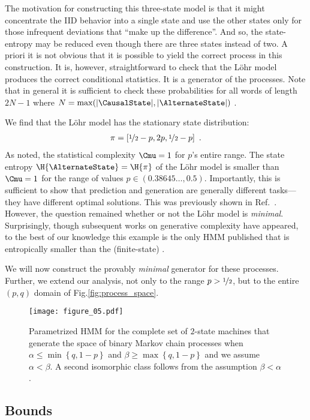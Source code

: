 \documentclass[final,nofootinbib,aps,pre,twocolumn,showpacs,groupaddress,preprintnumbers,floatfix]{revtex4-1}
\newcommand{\Lohr}{L{\"o}hr\xspace}
\begin{document}
The motivation for constructing this three-state model is that it might
concentrate the IID behavior into a single state and use the other states only
for those infrequent deviations that ``make up the difference''. And so, the
state-entropy may be reduced even though there are three states instead of two.
A priori it is not obvious that it is possible to yield the correct process in
this construction. It is, however, straightforward to check that the \Lohr
model produces the correct conditional statistics. It is a generator of the
processes. Note that in general it is sufficient to check these probabilities
for all words of length $2N-1$ where $N=\max(|\CausalState|,
|\AlternateState|)$ \cite[Corollary 4.3.9]{Uppe97a}.

We find that the \Lohr model has the stationary state distribution:
\begin{align*}
  \pi = \left[ \nicefrac{1}{2} - p, 2p, \nicefrac{1}{2} - p \right]
  ~.
\end{align*}
As noted, the statistical complexity $\Cmu = 1$ for $p$'s entire range. The
state entropy $\H{\AlternateState} = \H{\pi}$ of the \Lohr model is smaller
than $\Cmu=1$ for the range of values $p \in (0.38645\ldots, 0.5)$.
Importantly, this is sufficient to show that prediction and generation are
generally different tasks---they have different optimal solutions. This was
previously shown in Ref.~\cite{Lohr09b}. However, the question remained whether
or not the \Lohr model is \emph{minimal}. Surprisingly, though subsequent works
on generative complexity have appeared, to the best of our knowledge this
example is the only HMM published that is entropically smaller than the
(finite-state) \eM.

We will now construct the provably \emph{minimal} generator for these processes.
Further, we extend our analysis, not only to the range $p > \nicefrac{1}{2}$,
but to the entire $(p,q)$ domain of Fig.\nobreakspace \ref {fig:process_space}.

\begin{figure}
\centering
\texttt{[image: figure\_05.pdf]}
 \caption{Parametrized HMM for the complete set of $2$-state machines that
	generate the space of binary Markov chain processes when
	$\alpha \leq \min\left\{ q, 1-p \right\}$ and
	$\beta \geq \max\left\{ q, 1-p \right\}$ and we assume $\alpha < \beta$.
	A second isomorphic class follows from the assumption $\beta < \alpha$.
  }
\label{fig:bmc_pqab}
\end{figure}

\subsection{Bounds}
\label{sec:bounds}
\end{document}
